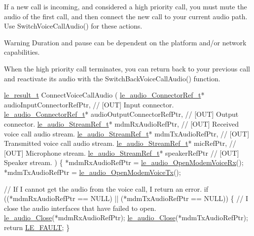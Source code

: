 If a new call is incoming, and considered a high priority call, you must mute the audio of the first call, and then connect the new call to your current audio path. Use Switch\+Voice\+Call\+Audio() for these actions.

\begin{DoxyWarning}{Warning}
Duration and pause can be dependent on the platform and/or network capabilities.
\end{DoxyWarning}
When the high priority call terminates, you can return back to your previous call and reactivate its audio with the Switch\+Back\+Voice\+Call\+Audio() function.


\begin{DoxyCode}
\hyperlink{le__basics_8h_a1cca095ed6ebab24b57a636382a6c86c}{le\_result\_t} ConnectVoiceCallAudio
(
    \hyperlink{le__audio__interface_8h_ab819480f4ce3f36e62b6a4e327668304}{le\_audio\_ConnectorRef\_t}*  audioInputConnectorRefPtr,  \textcolor{comment}{// [OUT] Input connector.}
    \hyperlink{le__audio__interface_8h_ab819480f4ce3f36e62b6a4e327668304}{le\_audio\_ConnectorRef\_t}*  audioOutputConnectorRefPtr, \textcolor{comment}{// [OUT] Output connector.}
    \hyperlink{le__audio__interface_8h_a9a46ff5a5afa61f1bc76120ab9e4da0a}{le\_audio\_StreamRef\_t}*     mdmRxAudioRefPtr,           \textcolor{comment}{// [OUT] Received voice call
       audio stream.}
    \hyperlink{le__audio__interface_8h_a9a46ff5a5afa61f1bc76120ab9e4da0a}{le\_audio\_StreamRef\_t}*     mdmTxAudioRefPtr,           \textcolor{comment}{// [OUT] Transmitted voice
       call audio stream.}
    \hyperlink{le__audio__interface_8h_a9a46ff5a5afa61f1bc76120ab9e4da0a}{le\_audio\_StreamRef\_t}*     micRefPtr,                  \textcolor{comment}{// [OUT] Microphone stream.}
    \hyperlink{le__audio__interface_8h_a9a46ff5a5afa61f1bc76120ab9e4da0a}{le\_audio\_StreamRef\_t}*     speakerRefPtr               \textcolor{comment}{// [OUT] Speaker stream.}
)
\{
    *mdmRxAudioRefPtr = \hyperlink{le__audio__interface_8h_ae3ed568ba4d2763ea77e17e77b20ff02}{le\_audio\_OpenModemVoiceRx}();
    *mdmTxAudioRefPtr = \hyperlink{le__audio__interface_8h_ad745f008bb04873c817da7af3daf783d}{le\_audio\_OpenModemVoiceTx}();

    \textcolor{comment}{// If I cannot get the audio from the voice call, I return an error.}
    \textcolor{keywordflow}{if} ((*mdmRxAudioRefPtr == NULL) || (*mdmTxAudioRefPtr == NULL))
    \{
            \textcolor{comment}{// I close the audio interfaces that  have failed to open.}
            \hyperlink{le__audio__interface_8h_abafeb411da7b1a14b2d5777fc1d3e394}{le\_audio\_Close}(*mdmRxAudioRefPtr);
            \hyperlink{le__audio__interface_8h_abafeb411da7b1a14b2d5777fc1d3e394}{le\_audio\_Close}(*mdmTxAudioRefPtr);
            \textcolor{keywordflow}{return} \hyperlink{le__basics_8h_a1cca095ed6ebab24b57a636382a6c86cac409634423b6b1ef09643529f6224798}{LE\_FAULT};
    \}


\end{DoxyCode}
